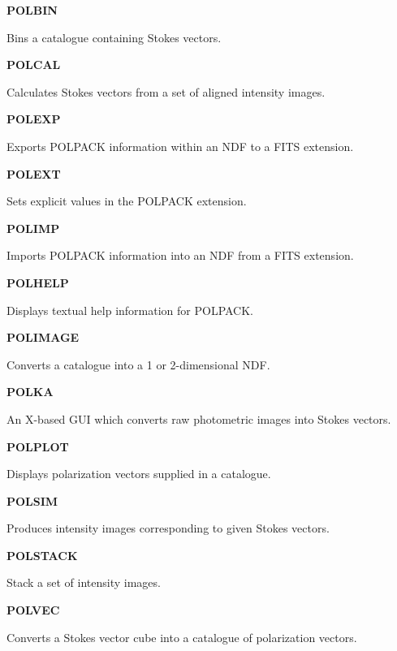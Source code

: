 \documentclass[twoside,11pt]{article}
\newenvironment{latexonly}{}{}
\renewcommand{\_}{\texttt{\symbol{95}}}
\newcommand{\quickdes}[3]{
                         \parbox{1.1in}{\bf #1}
                         \parbox{4.4in}{\raggedright #2 \dotfill}
                         \parbox{0.6in}{\pageref{#3}}
                         \vspace*{0.2in}}
\begin{document}
\newpage
\begin{latexonly}
\quickdes{POLBIN}{Bins a catalogue containing Stokes vectors.}{ POLBIN }

\quickdes{POLCAL}{Calculates Stokes vectors from a set of aligned intensity images.}{ POLCAL }

\quickdes{POLEXP}{Exports POLPACK information within an NDF to a FITS extension.}{ POLEXP }

\quickdes{POLEXT}{Sets explicit values in the POLPACK extension.}{ POLEXT }

\quickdes{POLIMP}{Imports POLPACK information into an NDF from a FITS extension.}{ POLEXP }

\quickdes{POLHELP}{Displays textual help information for POLPACK.}{ POLHELP }

\quickdes{POLIMAGE}{Converts a catalogue into a 1 or 2-dimensional NDF.}{ POLIMAGE }

\quickdes{POLKA}{An X-based GUI which converts raw photometric images into Stokes vectors.}{ POLKA }

\quickdes{POLPLOT}{Displays polarization vectors supplied in a catalogue.}{ POLPLOT }

\quickdes{POLSIM}{Produces intensity images corresponding to given Stokes vectors.}{ POLSIM }

\quickdes{POLSTACK}{Stack a set of intensity images.}{ POLSTACK }

\quickdes{POLVEC}{Converts a Stokes vector cube into a catalogue of polarization vectors.}{ POLVEC }
\end{latexonly}
\end{document}
